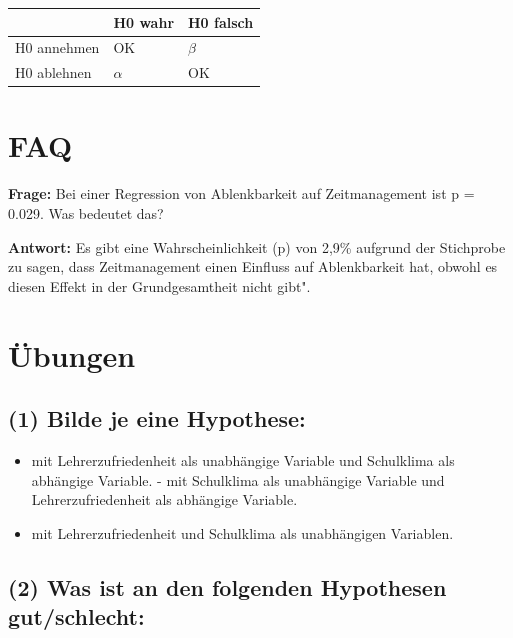 \documentclass[
]{book}
\providecommand{\tightlist}{%
  \setlength{\itemsep}{0pt}\setlength{\parskip}{0pt}}
\begin{document}
\begin{longtable}[]{@{}lll@{}}
\toprule
~ & H0 wahr & H0 falsch\tabularnewline
\midrule
\endhead
H0 annehmen & OK & \(\beta\)\tabularnewline
H0 ablehnen & \(\alpha\) & OK\tabularnewline
\bottomrule
\end{longtable}

\hypertarget{faq}{%
\section{FAQ}\label{faq}}

\textbf{Frage:} Bei einer Regression von Ablenkbarkeit auf Zeitmanagement ist p = 0.029. Was bedeutet das?

\textbf{Antwort:} Es gibt eine Wahrscheinlichkeit (p) von 2,9\% aufgrund der Stichprobe zu sagen, dass Zeitmanagement einen Einfluss auf Ablenkbarkeit hat, obwohl es diesen Effekt in der Grundgesamtheit nicht gibt".

\hypertarget{uxfcbungen-2}{%
\section{Übungen}\label{uxfcbungen-2}}

\hypertarget{bilde-je-eine-hypothese}{%
\subsection{(1) Bilde je eine Hypothese:}\label{bilde-je-eine-hypothese}}

\begin{itemize}
\tightlist
\item
  mit Lehrerzufriedenheit als unabhängige Variable und Schulklima als abhängige Variable. - mit Schulklima als unabhängige Variable und Lehrerzufriedenheit als abhängige Variable.
\item
  mit Lehrerzufriedenheit und Schulklima als unabhängigen Variablen.
\end{itemize}

\hypertarget{was-ist-an-den-folgenden-hypothesen-gutschlecht}{%
\subsection{(2) Was ist an den folgenden Hypothesen gut/schlecht:}\label{was-ist-an-den-folgenden-hypothesen-gutschlecht}}
\end{document}
